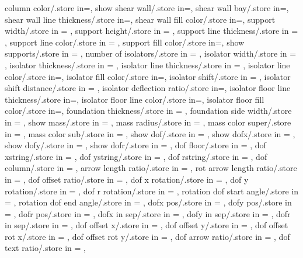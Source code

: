 {  column color/.store in=\columncolor,
  show shear wall/.store in=\showshearwall,
  shear wall bay/.store in=\shearwallbay,
  shear wall line thickness/.store in=\shearwalllinet,
  shear wall fill color/.store in=\shearwallfillcolor,
  support width/.store in = \supportwidth,
  support height/.store in = \supportheight,
  support line thickness/.store in = \baselinet,
  support line color/.store in = \supportlinecolor,
  support fill color/.store in=\supportfillcolor,
  show supports/.store in = \showsupports,
  number of isolators/.store in = \numberofisolators,
  isolator width/.store in = \isolationwidth,
  isolator thickness/.store in = \isolationdepth,
  isolator line thickness/.store in = \isolinet,
  isolator line color/.store in=\isolinecolor,
  isolator fill color/.store in=\isofillcolor,
  isolator shift/.store in = \isoshiftyn,
  isolator shift distance/.store in = \isoshift,
  isolator deflection ratio/.store in=\isodeflratio,
  isolator floor line thickness/.store in=\isofloorlinethk,
  isolator floor line color/.store in=\isofloorlinecolor,
  isolator floor fill color/.store in=\isofloorfillcolor,
  foundation thickness/.store in = \foundationdepth,
  foundation side width/.store in = \foundsidew,
  show mass/.store in = \showmass,
  mass radius/.store in = \massrad,
  mass color super/.store in = \masscolorsuper,
  mass color sub/.store in = \masscolorsub,
  show dof/.store in = \showdof,
  show dofx/.store in = \shodofx,
  show dofy/.store in = \shodofy,
  show dofr/.store in = \shodofr,
  dof floor/.store in = \doflocfloor,
  dof xstring/.store in = \dofxstr,
  dof ystring/.store in = \dofystr,
  dof rstring/.store in = \dofrstr,
  dof column/.store in = \dofloccolumn,
  arrow length ratio/.store in = \arrowlenratio,
  rot arrow length ratio/.store in = \rotarrowlenratio,
  dof offset ratio/.store in = \dofoffsetratio,
  dof x rotation/.store in = \dofxrotation,
  dof y rotation/.store in = \dofyrotation,
  dof r rotation/.store in = \dofrrotation,
  rotation dof start angle/.store in = \rotdofstartangle,
  rotation dof end angle/.store in = \rotdofendangle,
  dofx pos/.store in = \dofposx,
  dofy pos/.store in = \dofposy,
  dofr pos/.store in = \dofposr,
  dofx in sep/.store in = \dofinnersepx,
  dofy in sep/.store in = \dofinnersepy,
  dofr in sep/.store in = \dofinnersepr,
  dof offset x/.store in = \dofoffsetx,
  dof offset y/.store in = \dofoffsety,
  dof offset rot x/.store in = \dofrotoffsetx,  
  dof offset rot y/.store in = \dofrotoffsety,
  dof arrow ratio/.store in = \dofarrowratio,
  dof text ratio/.store in = \doftextratio,
}
